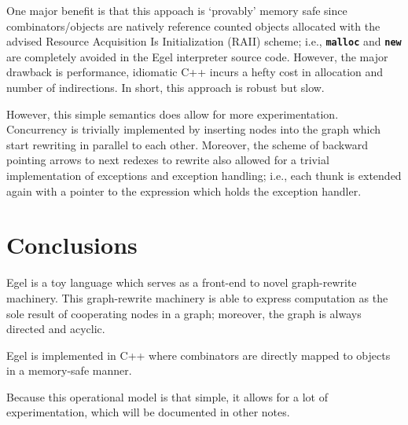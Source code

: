\documentclass{research4cacm}
\newcommand{\code}[1]{{\bf\texttt{#1}}}
\begin{document}
One major benefit is that this appoach is `provably'
memory safe since combinators/objects are natively
reference counted objects allocated with the advised
Resource Acquisition Is Initialization (RAII) scheme; i.e.,
\code{malloc} and \code{new} are 
completely avoided in the Egel interpreter source
code. However, the major drawback is
performance, idiomatic C++ incurs a hefty cost in
allocation and number of indirections. In short,
this approach is robust but slow.

However, this simple semantics does allow for
more experimentation. Concurrency is trivially
implemented by inserting nodes into the graph
which start rewriting in parallel to each other.
Moreover, the scheme of backward pointing arrows
to next redexes to rewrite also allowed for a
trivial implementation of exceptions and 
exception handling; i.e., each thunk is extended
again with a pointer to the expression which
holds the exception handler.

\section{Conclusions}

Egel is a toy language which serves as a front-end
to novel graph-rewrite machinery. This graph-rewrite
machinery is able to express computation as the 
sole result of cooperating nodes in a graph; moreover,
the graph is always directed and acyclic.

Egel is implemented in C++ where combinators
are directly mapped to objects in a memory-safe
manner.

Because this operational model is that simple, it
allows for a lot of experimentation, which will
be documented in other notes.



\balancecolumns
\end{document}

